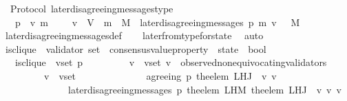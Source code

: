 \begin{isabellebody}
\isanewline
{}\isamarkupfalse%
\ {\isacharparenleft}\ Protocol{\isacharparenright}\ later{\isacharunderscore}disagreeing{\isacharunderscore}messages{\isacharunderscore}type\ {\isacharcolon}\isanewline
\ \ {\isachardoublequoteopen}{\isasymforall}\ p\ {\isasymsigma}\ v\ m{\isachardot}\ {\isasymsigma}\ {\isasymin}\ {\isasymSigma}\ {\isasymand}\ v\ {\isasymin}\ V\ {\isasymand}\ m\ {\isasymin}\ M\ {\isasymlongrightarrow}\ later{\isacharunderscore}disagreeing{\isacharunderscore}messages\ {\isacharparenleft}p{\isacharcomma}\ m{\isacharcomma}\ v{\isacharcomma}\ {\isasymsigma}{\isacharparenright}\ {\isasymsubseteq}\ M{\isachardoublequoteclose}\isanewline
%
\isadelimproof
\ \ %
\endisadelimproof
%
\isatagproof
{}\isamarkupfalse%
\ later{\isacharunderscore}disagreeing{\isacharunderscore}messages{\isacharunderscore}def\isanewline
\ \ \isamarkupfalse%
\ later{\isacharunderscore}from{\isacharunderscore}type{\isacharunderscore}for{\isacharunderscore}state\ \isamarkupfalse%
\ auto%
\endisatagproof
{\isafoldproof}%
%
\isadelimproof
\isanewline
%
\endisadelimproof
\isanewline
\isanewline
\isanewline
\isanewline
\isanewline
\isanewline
\isanewline
\isanewline
{}\isamarkupfalse%
\ is{\isacharunderscore}clique\ {\isacharcolon}{\isacharcolon}\ {\isachardoublequoteopen}{\isacharparenleft}validator\ set\ {\isacharasterisk}\ consensus{\isacharunderscore}value{\isacharunderscore}property\ {\isacharasterisk}\ state{\isacharparenright}\ {\isasymRightarrow}\ bool{\isachardoublequoteclose}\isanewline
\ \isanewline
\ \ \ {\isachardoublequoteopen}is{\isacharunderscore}clique\ {\isacharequal}\ {\isacharparenleft}{\isasymlambda}{\isacharparenleft}v{\isacharunderscore}set{\isacharcomma}\ p{\isacharcomma}\ {\isasymsigma}{\isacharparenright}{\isachardot}\ \isanewline
\ \ \ \ \ \ {\isacharparenleft}{\isasymforall}\ v\ {\isasymin}\ v{\isacharunderscore}set{\isachardot}\ v\ {\isasymin}\ observed{\isacharunderscore}non{\isacharunderscore}equivocating{\isacharunderscore}validators\ {\isasymsigma}\ \ \isanewline
\ \ \ \ \ \ \ {\isasymand}\ {\isacharparenleft}{\isasymforall}\ v{\isacharprime}\ {\isasymin}\ v{\isacharunderscore}set{\isachardot}\ \isanewline
\ \ \ \ \ \ \ \ \ \ \ \ \ agreeing\ {\isacharparenleft}p{\isacharcomma}\ {\isacharparenleft}the{\isacharunderscore}elem\ {\isacharparenleft}L{\isacharunderscore}H{\isacharunderscore}J\ {\isasymsigma}\ v{\isacharparenright}{\isacharparenright}{\isacharcomma}\ v{\isacharprime}{\isacharparenright}\isanewline
\ \ \ \ \ \ \ \ \ \ \ \ \ {\isasymand}\ later{\isacharunderscore}disagreeing{\isacharunderscore}messages\ {\isacharparenleft}p{\isacharcomma}\ the{\isacharunderscore}elem\ {\isacharparenleft}L{\isacharunderscore}H{\isacharunderscore}M\ {\isacharparenleft}the{\isacharunderscore}elem\ {\isacharparenleft}L{\isacharunderscore}H{\isacharunderscore}J\ {\isasymsigma}\ v{\isacharparenright}{\isacharparenright}\ v{\isacharprime}{\isacharparenright}{\isacharcomma}\ v{\isacharprime}{\isacharcomma}\ {\isasymsigma}{\isacharparenright}\ {\isacharequal}\ {\isasymemptyset}{\isacharparenright}{\isacharparenright}{\isacharparenright}{\isachardoublequoteclose}\isanewline

\end{isabellebody}
